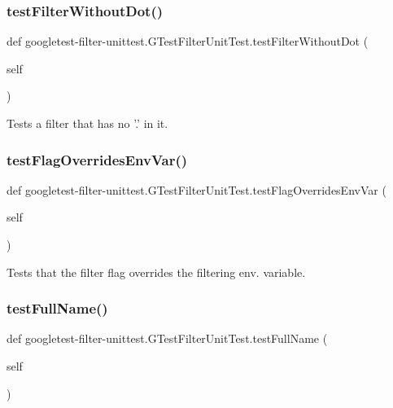 \subsubsection{\texorpdfstring{testFilterWithoutDot()}{testFilterWithoutDot()}}
{\footnotesize\ttfamily def googletest-\/filter-\/unittest.\+G\+Test\+Filter\+Unit\+Test.\+test\+Filter\+Without\+Dot (\begin{DoxyParamCaption}\item[{}]{self }\end{DoxyParamCaption})}

\begin{DoxyVerb}Tests a filter that has no '.' in it.\end{DoxyVerb}
 \mbox{\label{classgoogletest-filter-unittest_1_1GTestFilterUnitTest_a3cfc062fbcc396bfaa94184e10e3ae39}} 
\subsubsection{\texorpdfstring{testFlagOverridesEnvVar()}{testFlagOverridesEnvVar()}}
{\footnotesize\ttfamily def googletest-\/filter-\/unittest.\+G\+Test\+Filter\+Unit\+Test.\+test\+Flag\+Overrides\+Env\+Var (\begin{DoxyParamCaption}\item[{}]{self }\end{DoxyParamCaption})}

\begin{DoxyVerb}Tests that the filter flag overrides the filtering env. variable.\end{DoxyVerb}
 \mbox{\label{classgoogletest-filter-unittest_1_1GTestFilterUnitTest_a2fb67be78a3c92dcbae64479b220fe0f}} 
\subsubsection{\texorpdfstring{testFullName()}{testFullName()}}
{\footnotesize\ttfamily def googletest-\/filter-\/unittest.\+G\+Test\+Filter\+Unit\+Test.\+test\+Full\+Name (\begin{DoxyParamCaption}\item[{}]{self }\end{DoxyParamCaption})}

